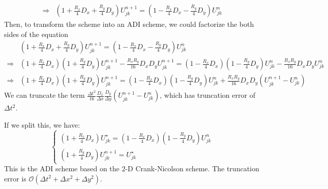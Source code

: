 \begin{answer}
\begin{equation}
\begin{aligned}
            \Rightarrow &(1+\tfrac{R_x}{4}D_x+\tfrac{R_y}{4}D_y)U_{jk}^{n+1} = (1-\tfrac{R_x}{4}D_x-\tfrac{R_y}{4}D_y)U_{jk}^n
        \end{aligned}
    \end{equation}
    Then, to transform the scheme into an ADI scheme, we could factorize the both sides of the equation
    \begin{equation}
        \begin{aligned}
            &(1+\tfrac{R_x}{4}D_x+\tfrac{R_y}{4}D_y)U_{jk}^{n+1} = (1-\tfrac{R_x}{4}D_x-\tfrac{R_y}{4}D_y)U_{jk}^n\\
            \Rightarrow &(1+\tfrac{R_x}{4}D_x)(1+\tfrac{R_y}{4}D_y)U_{jk}^{n+1} - \tfrac{R_xR_y}{16}D_xD_yU_{jk}^{n+1} = (1-\tfrac{R_x}{4}D_x)(1-\tfrac{R_y}{4}D_y)U_{jk}^n-\tfrac{R_xR_y}{16}D_xD_yU_{jk}^{n}\\
            \Rightarrow &(1+\tfrac{R_x}{4}D_x)(1+\tfrac{R_y}{4}D_y)U_{jk}^{n+1} = (1-\tfrac{R_x}{4}D_x)(1-\tfrac{R_y}{4}D_y)U_{jk}^n + \tfrac{R_xR_y}{16}D_xD_y(U_{jk}^{n+1}-U_{jk}^{n})
        \end{aligned}
    \end{equation}
    We can truncate the term $\tfrac{\Delta t^2}{16}\tfrac{D_x}{\Delta x}\tfrac{D_y}{\Delta y}(U_{jk}^{n+1}-U_{jk}^{n})$, which has truncation error of $\Delta t^2$.
    
    If we split this, we have:
    \begin{equation}
        \begin{cases}
            (1+\tfrac{R_x}{4}D_x)U_{jk}^{\star} = (1-\tfrac{R_x}{4}D_x)(1-\tfrac{R_y}{4}D_y)U_{jk}^n\\
            (1+\tfrac{R_y}{4}D_y)U_{jk}^{n+1} = U_{jk}^{\star}
        \end{cases}
    \end{equation}
    This is the ADI scheme based on the $2$-D Crank-Nicolson scheme. The truncation error is $\mathcal{O}(\Delta t^2 + \Delta x^2 + \Delta y^2)$.
    

\end{answer}
